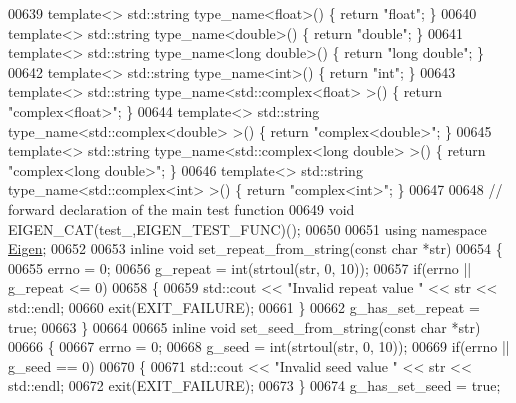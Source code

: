 \begin{DoxyCode}
00639 \textcolor{keyword}{template}<> std::string type\_name<float>()                       \{ \textcolor{keywordflow}{return} \textcolor{stringliteral}{"float"}; \}
00640 \textcolor{keyword}{template}<> std::string type\_name<double>()                      \{ \textcolor{keywordflow}{return} \textcolor{stringliteral}{"double"}; \}
00641 \textcolor{keyword}{template}<> std::string type\_name<long double>()                 \{ \textcolor{keywordflow}{return} \textcolor{stringliteral}{"long double"}; \}
00642 \textcolor{keyword}{template}<> std::string type\_name<int>()                         \{ \textcolor{keywordflow}{return} \textcolor{stringliteral}{"int"}; \}
00643 \textcolor{keyword}{template}<> std::string type\_name<std::complex<float> >()        \{ \textcolor{keywordflow}{return} \textcolor{stringliteral}{"complex<float>"}; \}
00644 \textcolor{keyword}{template}<> std::string type\_name<std::complex<double> >()       \{ \textcolor{keywordflow}{return} \textcolor{stringliteral}{"complex<double>"}; \}
00645 \textcolor{keyword}{template}<> std::string type\_name<std::complex<long double> >()  \{ \textcolor{keywordflow}{return} \textcolor{stringliteral}{"complex<long double>"}; \}
00646 \textcolor{keyword}{template}<> std::string type\_name<std::complex<int> >()          \{ \textcolor{keywordflow}{return} \textcolor{stringliteral}{"complex<int>"}; \}
00647 
00648 \textcolor{comment}{// forward declaration of the main test function}
00649 \textcolor{keywordtype}{void} EIGEN\_CAT(test\_,EIGEN\_TEST\_FUNC)();
00650 
00651 \textcolor{keyword}{using namespace }\hyperlink{namespace_eigen}{Eigen};
00652 
00653 \textcolor{keyword}{inline} \textcolor{keywordtype}{void} set\_repeat\_from\_string(\textcolor{keyword}{const} \textcolor{keywordtype}{char} *str)
00654 \{
00655   errno = 0;
00656   g\_repeat = int(strtoul(str, 0, 10));
00657   \textcolor{keywordflow}{if}(errno || g\_repeat <= 0)
00658   \{
00659     std::cout << \textcolor{stringliteral}{"Invalid repeat value "} << str << std::endl;
00660     exit(EXIT\_FAILURE);
00661   \}
00662   g\_has\_set\_repeat = \textcolor{keyword}{true};
00663 \}
00664 
00665 \textcolor{keyword}{inline} \textcolor{keywordtype}{void} set\_seed\_from\_string(\textcolor{keyword}{const} \textcolor{keywordtype}{char} *str)
00666 \{
00667   errno = 0;
00668   g\_seed = int(strtoul(str, 0, 10));
00669   \textcolor{keywordflow}{if}(errno || g\_seed == 0)
00670   \{
00671     std::cout << \textcolor{stringliteral}{"Invalid seed value "} << str << std::endl;
00672     exit(EXIT\_FAILURE);
00673   \}
00674   g\_has\_set\_seed = \textcolor{keyword}{true};

\end{DoxyCode}
